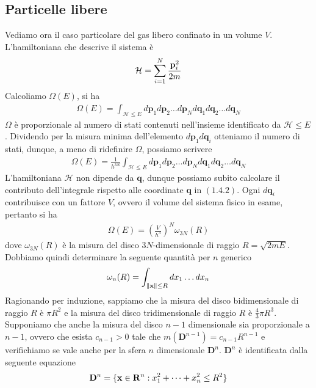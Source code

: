 \documentclass{article}
\begin{document}
\newpage
\subsection{Particelle libere}
Vediamo ora il caso particolare del gas libero confinato in un volume $V$. L'hamiltoniana che descrive il sistema è
\begin{gather}
    \mathcal{H} = \sum_{i = 1}^N \frac{\mathbf{p}^2_i}{2m} \notag
\end{gather}
Calcoliamo $\Omega(E)$, si ha
\begin{gather}
    \Omega(E) = \int_{\mathcal{H} \leq E} d\mathbf{p}_1d\mathbf{p}_2 \dots d\mathbf{p}_Nd\mathbf{q}_1d\mathbf{q}_2 \dots d\mathbf{q}_N \tag{1.4.1}
\end{gather}
$\Omega$ è proporzionale al numero di stati contenuti nell'insieme identificato da $\mathcal{H} \leq E$. Dividendo per la misura minima dell'elemento $d\mathbf{p}_1d\mathbf{q}_i$ otteniamo il numero di stati, dunque, a meno di ridefinire $\Omega$, possiamo scrivere
\begin{gather}
    \Omega(E) = \frac{1}{h^{3N}}\int_{\mathcal{H} \leq E}d\mathbf{p}_1d\mathbf{p}_2 \dots d\mathbf{p}_Nd\mathbf{q}_1d\mathbf{q}_2 \dots d\mathbf{q}_N \tag{1.4.2}
\end{gather}
L'hamiltoniana $\mathcal{H}$ non dipende da $\mathbf{q}$, dunque possiamo subito calcolare il contributo dell'integrale rispetto alle coordinate $\mathbf{q}$ in $(1.4.2)$. Ogni $d\mathbf{q}_i$ contribuisce con un fattore $V$, ovvero il volume del sistema fisico in esame, pertanto si ha
\begin{gather}
    \Omega(E) = \left(\frac{V}{h^3}\right)^N\omega_{3N}(R) \tag{1.4.3}
\end{gather}
dove $\omega_{3N}(R)$ è la misura del disco $3N$-dimensionale di raggio $R = \sqrt{2mE}$. Dobbiamo quindi determinare la seguente quantità per $n$ generico
\begin{gather}
    \omega_n(R) = \int_{\|\mathbf{x}\| \leq R}dx_1 \dots dx_n \notag
\end{gather}
Ragionando per induzione, sappiamo che la misura del disco bidimensionale di raggio $R$ è $\pi R^2$ e la misura del disco tridimensionale di raggio $R$ è $\frac{4}{3}\pi R^3$. Supponiamo che anche la misura del disco $n - 1$ dimensionale sia proporzionale a $n - 1$, ovvero che esista $c_{n - 1} > 0$ tale che $m(\mathbf{D}^{n - 1}) = c_{n - 1}R^{n - 1}$ e verifichiamo se vale anche per la sfera $n$ dimensionale $\mathbf{D}^n$. $\mathbf{D}^n$ è identificata dalla seguente equazione
\begin{gather}
    \mathbf{D}^n = \{\mathbf{x} \in \mathbf{R}^n : x^2_1 + \dots + x^2_n \leq R^2\} \notag
\end{gather}
\end{document}
